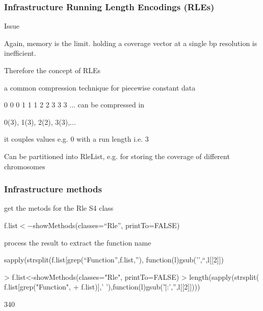 \documentclass{beamer}
\begin{document}

\begin{frame}
\frametitle{Infrastructure Running Length Encodings (RLEs)}
 \bit
    \item Issue
      \bit
	  \item Again, memory is the limit. holding a  coverage vector at a single bp resolution is inefficient.
      \eit
     \item Therefore the concept of RLEs
      \bit
	  \item a common compression technique for piecewise constant data
	    \bit
		\item 0 0 0 1 1 1 2 2 3 3 3 ... can be compressed in
		\item 0(3), 1(3), 2(2), 3(3),...
	    \eit
	   \item it couples values e.g. 0 with a run length i.e. 3
	   \item Can be partitioned into RleList, e.g. for storing the coverage of different chromosomes
      \eit
 \eit
\end{frame}


\begin{frame}[fragile]
\frametitle{Infrastructure methods}
 \bit
    \item get the metods for the Rle S4 class
      \bit
	  \item f.list$<-$showMethods(classes=``Rle'', printTo=FALSE) 
      \eit
     \item process the result to extract the function name
      \bit
	  \item sapply(strsplit(f.list[grep(``Function'',f.list,''), function(l){gsub('\:',``,l[[2]])}
      \eit
 \eit
{}
      \begin{uncoverenv}
\begin{Schunk}
\begin{Sinput}
> f.list<-showMethods(classes="Rle", printTo=FALSE)
> length(sapply(strsplit( f.list[grep("Function",
+   f.list)],' '),function(l){gsub('\"|:','',l[[2]])}))
\end{Sinput}
\begin{Soutput}
[1] 340
\end{Soutput}
\end{Schunk}
 \end{uncoverenv}
    \eB
\end{frame}
\end{document}
